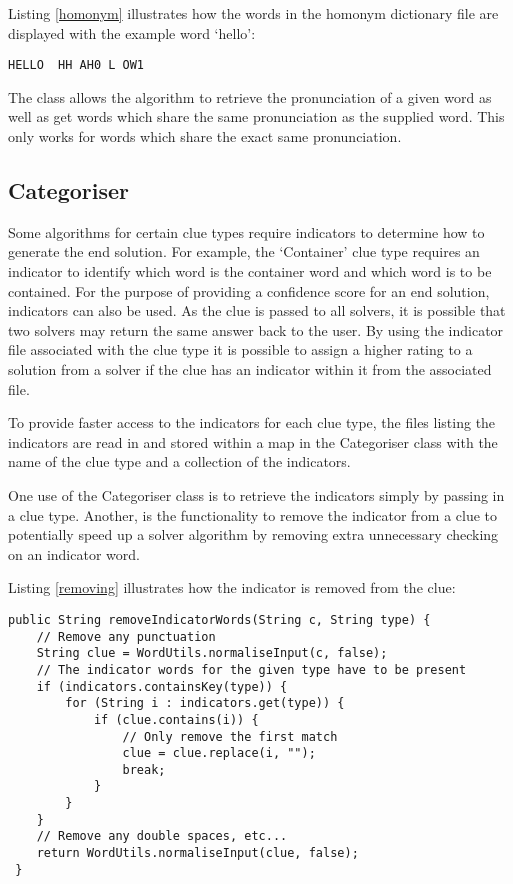 Listing \ref{homonym} illustrates how the words in the homonym dictionary file are
displayed with the example word `hello':

\begin{lstlisting}[caption={A sample of the homonym dictionary file for the word `hello'},
                   label=homonym]  
HELLO  HH AH0 L OW1
\end{lstlisting}

The class allows the algorithm to retrieve the pronunciation of a given word as well as 
get words which share the same pronunciation as the supplied word. This only works for words
 which share the exact same pronunciation.

\subsection{Categoriser}

Some algorithms for certain clue types require indicators to determine how to generate 
the end solution. For example, the `Container' clue type requires an indicator to identify 
which word is the container word and which word is to be contained. For the purpose of 
providing a confidence score for an end solution, indicators can also be used. As the clue 
is passed to all solvers, it is possible that two solvers may return the same answer back to the user.
 By using the indicator file associated with the clue type it is possible to assign a higher rating 
to a solution from a solver if the clue has an indicator within it from the associated file.

To provide faster access to the indicators for each clue type, the files listing the indicators 
are read in and stored within a map in the Categoriser class with the name of the clue type 
and a collection of the indicators. 

One use of the Categoriser class is to retrieve the indicators simply by passing in a clue type. 
Another, is the functionality to remove the indicator from a clue to potentially speed up a solver 
algorithm by removing extra unnecessary checking on an indicator word.  

Listing \ref{removing} illustrates how the indicator is removed from the clue:

\begin{lstlisting}[caption={Removing the indicator from the clue},
                   label=removing]  
 public String removeIndicatorWords(String c, String type) {
	// Remove any punctuation
	String clue = WordUtils.normaliseInput(c, false);
	// The indicator words for the given type have to be present
	if (indicators.containsKey(type)) {
		for (String i : indicators.get(type)) {
			if (clue.contains(i)) {
				// Only remove the first match
				clue = clue.replace(i, "");
				break;
			}
		}
	}
	// Remove any double spaces, etc...
	return WordUtils.normaliseInput(clue, false);
 }
\end{lstlisting}

